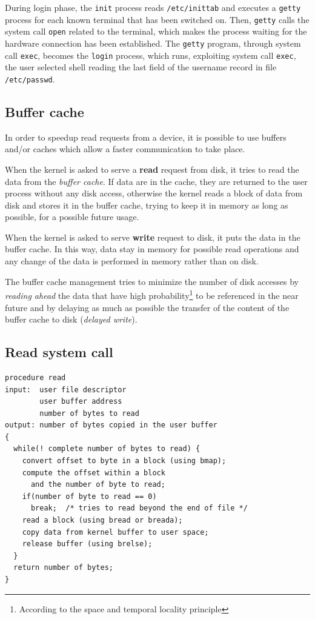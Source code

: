 During login phase, the \texttt{init} process reads \texttt{/etc/inittab} and executes a \texttt{getty} process for each known terminal that has been switched on. Then, \texttt{getty} calls the system call \texttt{open} related to the terminal, which makes the process waiting for the hardware connection has been established. The \texttt{getty} program, through system call \texttt{exec}, becomes the \texttt{login} process, which runs, exploiting system call \texttt{exec}, the user selected shell reading the last field of the username record in file \texttt{/etc/passwd}.

\subsection{Buffer cache}
In order to speedup read requests from a device, it is possible to use buffers and/or caches which allow a faster communication to take place.

When the kernel is asked to serve a \textbf{read} request from disk, it tries to read the data from the \emph{buffer cache}. If data are in the cache, they are returned to the user process without any disk access, otherwise the kernel reads a block of data from disk and stores it in the buffer cache, trying to keep it in memory as long as possible, for a possible future usage.

When the kernel is asked to serve \textbf{write} request to disk, it puts the data in the buffer cache. In this way, data stay in memory for possible read operations and any change of the data is performed in memory rather than on disk.

The buffer cache management tries to minimize the number of disk accesses by \emph{reading ahead} the data that have high probability\footnote{According to the space and temporal locality principle} to be referenced in the near future and by delaying as much as possible the transfer of the content of the buffer cache to disk (\emph{delayed write}).

\subsection*{Read system call}
\begin{verbatim}
procedure read
input:  user file descriptor
        user buffer address
        number of bytes to read
output: number of bytes copied in the user buffer
{
  while(! complete number of bytes to read) {
    convert offset to byte in a block (using bmap);
    compute the offset within a block
      and the number of byte to read;
    if(number of byte to read == 0)
      break;  /* tries to read beyond the end of file */
    read a block (using bread or breada);
    copy data from kernel buffer to user space;
    release buffer (using brelse);
  }
  return number of bytes;
}
\end{verbatim}

